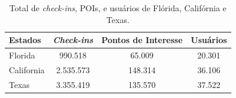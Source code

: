 \begin{table}[htbp]
\centering
\caption{Total de \textit{check-ins}, POIs, e usuários de Flórida, Califórnia e Texas.}
\label{tab:dataset}
\begin{tabular}{lccc}
\hline
Estados & \textit{Check-ins} & Pontos de Interesse & Usuários \\
\hline
Florida & 990.518 & 65.009 & 20.301 \\
California & 2.535.573 & 148.314 & 36.106 \\
Texas & 3.355.419 & 135.570 & 37.522 \\
\hline
\end{tabular}
\end{table}